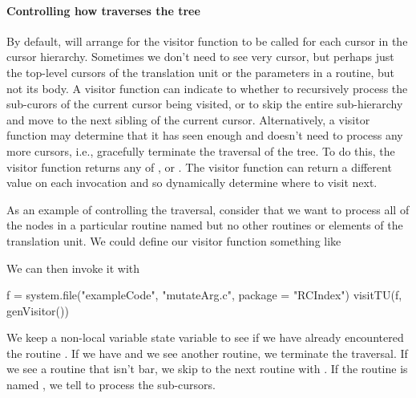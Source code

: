 \paragraph{Controlling how \libclang{} traverses the tree}
By default,  will arrange for the visitor function
to be called for each cursor in the cursor hierarchy.  Sometimes we
don't need to see very cursor, but perhaps just the top-level cursors
of the translation unit or the parameters in a routine, but not its
body.  A visitor function can indicate to \libclang{} whether to
recursively process the sub-curors of the current cursor being
visited, or to skip the entire sub-hierarchy and move to the next
sibling of the current cursor.  Alternatively, a visitor function may
determine that it has seen enough and doesn't need to process any more
cursors, i.e., gracefully terminate the traversal of the tree.  To do
this, the visitor function returns any of ,
 or .  The
visitor function can return a different value on each invocation and
so dynamically determine where to visit next.  

As an example of controlling the traversal, consider that we want to
process all of the nodes in a particular routine named  but
no other routines or elements of the translation unit. 
We could define our visitor function something like
We can then invoke it with
\begin{RCode}
f = system.file("exampleCode", "mutateArg.c", package = "RCIndex")
visitTU(f, genVisitor())  
\end{RCode}
We keep a non-local variable state variable to see if we have
already encountered the routine .
If we have and we see another routine, we terminate the traversal.
If we see a routine that isn't bar, we skip to the next routine
with .
If the routine is named , we tell \libclang{}
to process the sub-cursors.

